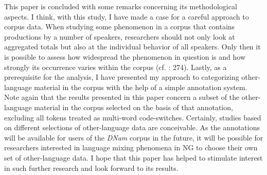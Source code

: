 \documentclass[output=paper]{langsci/langscibook}
\begin{document}
This paper is concluded with some remarks concerning its methodological aspects. I think, with this study, I have made a case for a careful approach to corpus data. When studying some phenomenon in a corpus that contains productions by a number of speakers, researchers should not only look at aggregated totals but also at the individual behavior of all speakers. Only then it is possible to assess how widespread the phenomenon in question is and how strongly its occurrence varies within the corpus (cf. \citealt{gries_useful_2010}: 274). Lastly, as a prerequisite for the analysis, I have presented my approach to categorizing other-language material in the corpus with the help of a simple annotation system. Note again that the results presented in this paper concern a subset of the other-language material in the corpus selected on the basis of that annotation, excluding all tokens treated as multi-word code-switches. Certainly, studies based on different selections of other-language data are conceivable. As the annotations will be available for users of the \textit{DNam} corpus in the future, it will be possible for researchers interested in language mixing phenomena in NG to choose their own set of other-language data. I hope that this paper has helped to stimulate interest in such further research and look forward to its results.


{\sloppy\printbibliography[heading=subbibliography,notkeyword=this]}
\end{document}
